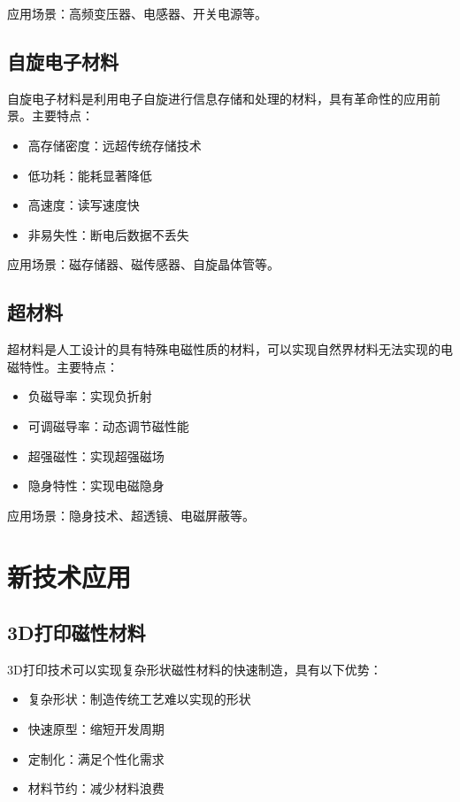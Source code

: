 \documentclass[12pt,UTF8]{ctexbook}
\begin{document}
应用场景：高频变压器、电感器、开关电源等。

\subsection{自旋电子材料}

自旋电子材料是利用电子自旋进行信息存储和处理的材料，具有革命性的应用前景。主要特点：

\begin{itemize}[leftmargin=2cm]
    \item 高存储密度：远超传统存储技术
    \item 低功耗：能耗显著降低
    \item 高速度：读写速度快
    \item 非易失性：断电后数据不丢失
\end{itemize}

应用场景：磁存储器、磁传感器、自旋晶体管等。

\subsection{超材料}

超材料是人工设计的具有特殊电磁性质的材料，可以实现自然界材料无法实现的电磁特性。主要特点：

\begin{itemize}[leftmargin=2cm]
    \item 负磁导率：实现负折射
    \item 可调磁导率：动态调节磁性能
    \item 超强磁性：实现超强磁场
    \item 隐身特性：实现电磁隐身
\end{itemize}

应用场景：隐身技术、超透镜、电磁屏蔽等。

\section{新技术应用}

\subsection{3D打印磁性材料}

3D打印技术可以实现复杂形状磁性材料的快速制造，具有以下优势：

\begin{itemize}[leftmargin=2cm]
    \item 复杂形状：制造传统工艺难以实现的形状
    \item 快速原型：缩短开发周期
    \item 定制化：满足个性化需求
    \item 材料节约：减少材料浪费
\end{itemize}
\end{document}
